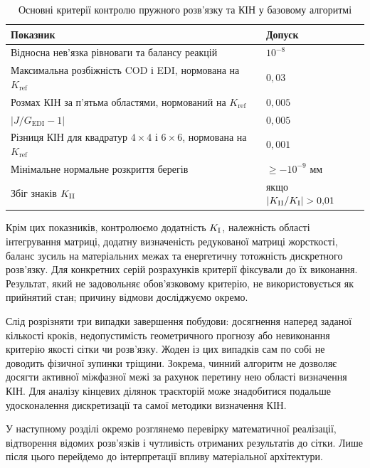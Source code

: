 \begin{table}[htbp]
 \centering
 \caption{Основні критерії контролю пружного розв'язку та КІН у базовому алгоритмі}
 \label{tab:method-gates}
 \begin{tabularx}{\textwidth}{Xl}
 \toprule
 Показник & Допуск\\
 \midrule
 Відносна нев'язка рівноваги та балансу реакцій & $10^{-8}$\\
 Максимальна розбіжність COD і EDI, нормована на $K_{\mathrm{ref}}$ & $0{,}03$\\
 Розмах КІН за п'ятьма областями, нормований на $K_{\mathrm{ref}}$ & $0{,}005$\\
 $\left|J/G_{\mathrm{EDI}}-1\right|$ & $0{,}005$\\
 Різниця КІН для квадратур $4\times4$ і $6\times6$, нормована на $K_{\mathrm{ref}}$ & $0{,}001$\\
 Мінімальне нормальне розкриття берегів & $\ge-10^{-9}$ мм\\
 Збіг знаків $K_{\mathrm{II}}$ & якщо $|\KII/\KI|>0{,}01$\\
 \bottomrule
 \end{tabularx}
\end{table}
Крім цих показників, контролюємо додатність $K_{\mathrm{I}}$, належність області інтегрування матриці, додатну визначеність редукованої матриці жорсткості, баланс зусиль на матеріальних межах та енергетичну тотожність дискретного розв'язку. Для конкретних серій розрахунків критерії фіксували до їх виконання. Результат, який не задовольняє обов'язковому критерію, не використовується як прийнятий стан; причину відмови досліджуємо окремо.

Слід розрізняти три випадки завершення побудови: досягнення наперед заданої кількості кроків, недопустимість геометричного прогнозу або невиконання критерію якості сітки чи розв'язку. Жоден із цих випадків сам по собі не доводить фізичної зупинки тріщини. Зокрема, чинний алгоритм не дозволяє досягти активної міжфазної межі за рахунок перетину нею області визначення КІН. Для аналізу кінцевих ділянок траєкторій може знадобитися подальше удосконалення дискретизації та самої методики визначення КІН.

У наступному розділі окремо розглянемо перевірку математичної реалізації, відтворення відомих розв'язків і чутливість отриманих результатів до сітки. Лише після цього перейдемо до інтерпретації впливу матеріальної архітектури.
